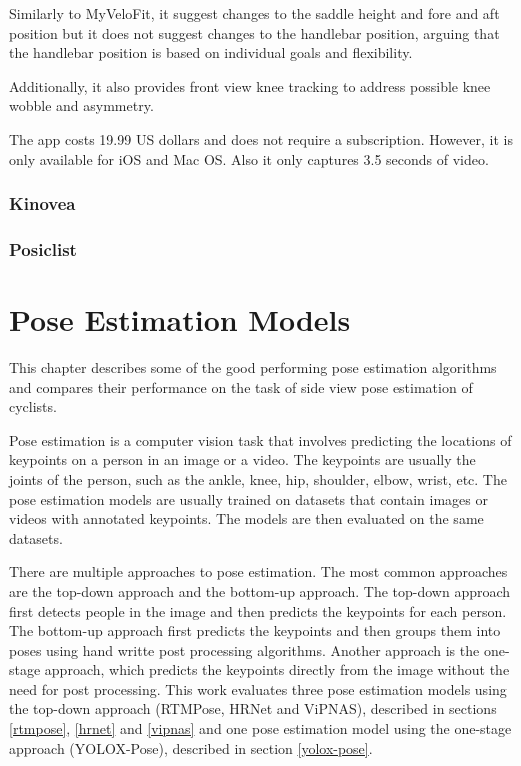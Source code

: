 Similarly to MyVeloFit, it suggest changes to the saddle height and fore and aft position but it does not suggest changes to the handlebar position, arguing that the handlebar position is based on individual goals and flexibility.

Additionally, it also provides front view knee tracking to address possible knee wobble and asymmetry.

The app costs 19.99 US dollars and does not require a subscription. However, it is only available for iOS and Mac OS. Also it only captures 3.5 seconds of video.


\subsection{Kinovea}


\subsection{Posiclist}




\chapter{Pose Estimation Models}
\label{ch:pose_estimation}

This chapter describes some of the good performing pose estimation algorithms and compares their performance on the task of side view pose estimation of cyclists.

Pose estimation is a computer vision task that involves predicting the locations of keypoints on a person in an image or a video. The keypoints are usually the joints of the person, such as the ankle, knee, hip, shoulder, elbow, wrist, etc. The pose estimation models are usually trained on datasets that contain images or videos with annotated keypoints. The models are then evaluated on the same datasets.

There are multiple approaches to pose estimation. The most common approaches are the top-down approach and the bottom-up approach. The top-down approach first detects people in the image and then predicts the keypoints for each person. The bottom-up approach first predicts the keypoints and then groups them into poses using hand writte post processing algorithms. Another approach is the one-stage approach, which predicts the keypoints directly from the image without the need for post processing. This work evaluates three pose estimation models using the top-down approach (RTMPose, HRNet and ViPNAS), described in sections \ref{rtmpose}, \ref{hrnet} and \ref{vipnas} and one pose estimation model using the one-stage approach (YOLOX-Pose), described in section \ref{yolox-pose}.

